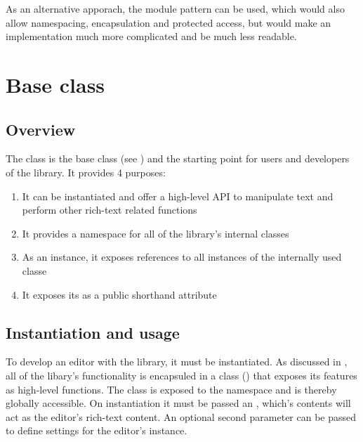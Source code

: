 As an alternative apporach, the module pattern can be used, which would also allow namespacing, encapsulation and protected access, but would make an implementation much more complicated and be much less readable.



\section{Base class}
\label{sec:core}

\subsection{Overview}

The  class is the base class (see ) and the starting point for users and developers of the library. It provides 4 purposes:

\begin{enumerate}
\item It can be instantiated and offer a high-level API to manipulate text and perform other rich-text related functions
\item It provides a namespace for all of the library's internal classes
\item As an instance, it exposes references to all instances of the internally used classe
\item It exposes its  as a public shorthand attribute
\end{enumerate}

\subsection{Instantiation and usage}
\label{subsec:instantiation_usage}

To develop an editor with the library, it must be instantiated. As discussed in , all of the libary's functionality is encapsuled in a class () that exposes its features as high-level functions. The  class is exposed to the  namespace and is thereby globally accessible. On instantiation it must be passed an , which's contents will act as the editor's rich-text content. An optional second parameter can be passed to define settings for the editor's instance.

